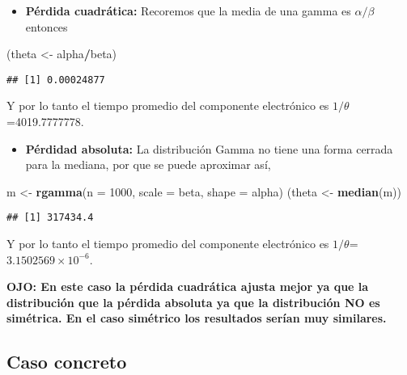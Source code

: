 \documentclass[
  12pt,
]{book}
\newenvironment{Shaded}{\begin{snugshade}}{\end{snugshade}}
\newcommand{\DataTypeTok}[1]{\textcolor[rgb]{0.13,0.29,0.53}{#1}}
\newcommand{\DecValTok}[1]{\textcolor[rgb]{0.00,0.00,0.81}{#1}}
\newcommand{\KeywordTok}[1]{\textcolor[rgb]{0.13,0.29,0.53}{\textbf{#1}}}
\newcommand{\NormalTok}[1]{#1}
\newcommand{\OperatorTok}[1]{\textcolor[rgb]{0.81,0.36,0.00}{\textbf{#1}}}
\newcommand{\StringTok}[1]{\textcolor[rgb]{0.31,0.60,0.02}{#1}}
\providecommand{\tightlist}{%
  \setlength{\itemsep}{0pt}\setlength{\parskip}{0pt}}
\begin{document}
\begin{itemize}
\tightlist
\item
  \textbf{Pérdida cuadrática:} Recoremos que la media de una gamma es \(\alpha/\beta\) entonces
\end{itemize}

\begin{Shaded}
\begin{Highlighting}[]
\NormalTok{(theta \textless{}{-}}\StringTok{ }\NormalTok{alpha}\OperatorTok{/}\NormalTok{beta)}
\end{Highlighting}
\end{Shaded}

\begin{verbatim}
## [1] 0.00024877
\end{verbatim}

Y por lo tanto el tiempo promedio del componente electrónico es \(1/\theta\)=4019.7777778.

\begin{itemize}
\tightlist
\item
  \textbf{Pérdidad absoluta:} La distribución Gamma no tiene una forma cerrada para la mediana, por que se puede aproximar así,
\end{itemize}

\begin{Shaded}
\begin{Highlighting}[]
\NormalTok{m \textless{}{-}}\StringTok{ }\KeywordTok{rgamma}\NormalTok{(}\DataTypeTok{n =} \DecValTok{1000}\NormalTok{, }\DataTypeTok{scale =}\NormalTok{ beta, }\DataTypeTok{shape =}\NormalTok{ alpha)}
\NormalTok{(theta \textless{}{-}}\StringTok{ }\KeywordTok{median}\NormalTok{(m))}
\end{Highlighting}
\end{Shaded}

\begin{verbatim}
## [1] 317434.4
\end{verbatim}

Y por lo tanto el tiempo promedio del componente electrónico es \(1/\theta\)=\ensuremath{3.1502569\times 10^{-6}}.

\textbf{OJO: En este caso la pérdida cuadrática ajusta mejor ya que la distribución que la pérdida absoluta ya que la distribución NO es simétrica. En el caso simétrico los resultados serían muy similares.}

\hypertarget{caso-concreto}{%
\subsection{Caso concreto}\label{caso-concreto}}
\end{document}
